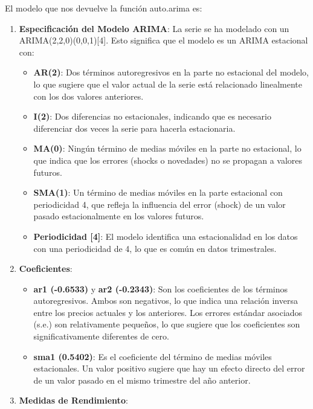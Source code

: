 \documentclass[
]{article}
\begin{document}
El modelo que nos devuelve la función auto.arima es:

\begin{enumerate}
\def\labelenumi{\arabic{enumi}.}
\item
  \textbf{Especificación del Modelo ARIMA}: La serie se ha modelado con
  un ARIMA(2,2,0)(0,0,1){[}4{]}. Esto significa que el modelo es un
  ARIMA estacional con:

  \begin{itemize}
  \item
    \textbf{AR(2)}: Dos términos autoregresivos en la parte no
    estacional del modelo, lo que sugiere que el valor actual de la
    serie está relacionado linealmente con los dos valores anteriores.
  \item
    \textbf{I(2)}: Dos diferencias no estacionales, indicando que es
    necesario diferenciar dos veces la serie para hacerla estacionaria.
  \item
    \textbf{MA(0)}: Ningún término de medias móviles en la parte no
    estacional, lo que indica que los errores (shocks o novedades) no se
    propagan a valores futuros.
  \item
    \textbf{SMA(1)}: Un término de medias móviles en la parte estacional
    con periodicidad 4, que refleja la influencia del error (shock) de
    un valor pasado estacionalmente en los valores futuros.
  \item
    \textbf{Periodicidad {[}4{]}}: El modelo identifica una
    estacionalidad en los datos con una periodicidad de 4, lo que es
    común en datos trimestrales.
  \end{itemize}
\item
  \textbf{Coeficientes}:

  \begin{itemize}
  \item
    \textbf{ar1 (-0.6533)} y \textbf{ar2 (-0.2343)}: Son los
    coeficientes de los términos autoregresivos. Ambos son negativos, lo
    que indica una relación inversa entre los precios actuales y los
    anteriores. Los errores estándar asociados (s.e.) son relativamente
    pequeños, lo que sugiere que los coeficientes son significativamente
    diferentes de cero.
  \item
    \textbf{sma1 (0.5402)}: Es el coeficiente del término de medias
    móviles estacionales. Un valor positivo sugiere que hay un efecto
    directo del error de un valor pasado en el mismo trimestre del año
    anterior.
  \end{itemize}
\item
  \textbf{Medidas de Rendimiento}:


\end{enumerate}
\end{document}
